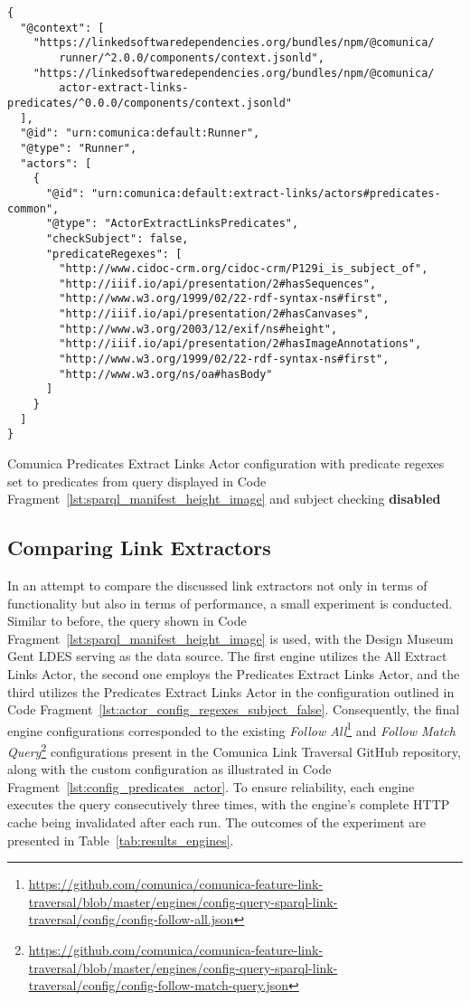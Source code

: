 \begin{listing}[htbp]
    \begin{verbatim}
{
  "@context": [
    "https://linkedsoftwaredependencies.org/bundles/npm/@comunica/
        runner/^2.0.0/components/context.jsonld",
    "https://linkedsoftwaredependencies.org/bundles/npm/@comunica/
        actor-extract-links-predicates/^0.0.0/components/context.jsonld"
  ],
  "@id": "urn:comunica:default:Runner",
  "@type": "Runner",
  "actors": [
    {
      "@id": "urn:comunica:default:extract-links/actors#predicates-common",
      "@type": "ActorExtractLinksPredicates",
      "checkSubject": false,
      "predicateRegexes": [
        "http://www.cidoc-crm.org/cidoc-crm/P129i_is_subject_of",
        "http://iiif.io/api/presentation/2#hasSequences",
        "http://www.w3.org/1999/02/22-rdf-syntax-ns#first",
        "http://iiif.io/api/presentation/2#hasCanvases",
        "http://www.w3.org/2003/12/exif/ns#height",
        "http://iiif.io/api/presentation/2#hasImageAnnotations",
        "http://www.w3.org/1999/02/22-rdf-syntax-ns#first",
        "http://www.w3.org/ns/oa#hasBody"
      ]
    }
  ]
}
    \end{verbatim}
    \caption{Comunica Predicates Extract Links Actor configuration with predicate regexes set to predicates from query displayed in Code Fragment~\ref{lst:sparql_manifest_height_image} and subject checking \textbf{disabled}}
    \label{lst:actor_config_regexes_subject_false}
\end{listing}

\subsection{Comparing Link Extractors}

In an attempt to compare the discussed link extractors not only in terms of functionality but also in terms of performance, a small experiment is conducted. Similar to before, the query shown in Code Fragment~\ref{lst:sparql_manifest_height_image} is used, with the Design Museum Gent LDES serving as the data source. The first engine utilizes the All Extract Links Actor, the second one employs the Predicates Extract Links Actor, and the third utilizes the Predicates Extract Links Actor in the configuration outlined in Code Fragment~\ref{lst:actor_config_regexes_subject_false}. Consequently, the final engine configurations corresponded to the existing \textit{Follow All}\footnote{\url{https://github.com/comunica/comunica-feature-link-traversal/blob/master/engines/config-query-sparql-link-traversal/config/config-follow-all.json}} and \textit{Follow Match Query}\footnote{\url{https://github.com/comunica/comunica-feature-link-traversal/blob/master/engines/config-query-sparql-link-traversal/config/config-follow-match-query.json}} configurations present in the Comunica Link Traversal GitHub repository, along with the custom configuration as illustrated in Code Fragment~\ref{lst:config_predicates_actor}. To ensure reliability, each engine executes the query consecutively three times, with the engine's complete HTTP cache being invalidated after each run. The outcomes of the experiment are presented in Table~\ref{tab:results_engines}.

